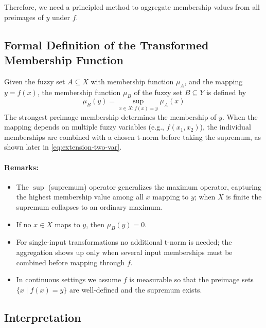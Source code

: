 Therefore, we need a principled method to aggregate membership values from all preimages of \( y \) under \( f \).

\subsection{Formal Definition of the Transformed Membership Function}
\label{sec:fuzzyrelations_formal_definition_of_the_transformed_membership_function}

Given the fuzzy set \( A \subseteq X \) with membership function \(\mu_A\), and the mapping \( y = f(x) \), the membership function \(\mu_B\) of the fuzzy set \( B \subseteq Y \) is defined by
\begin{equation}
    \mu_B(y) = \sup_{x \in X: f(x) = y} \mu_A(x)
    \label{eq:membership-transform}
\end{equation}
The strongest preimage membership determines the membership of \(y\). When the mapping depends on multiple fuzzy variables (e.g., \(f(x_1, x_2)\)), the individual memberships are combined with a chosen t\hyp{}norm before taking the supremum, as shown later in \eqref{eq:extension-two-var}.

\paragraph{Remarks:}
\begin{itemize}
    \item The \(\sup\) (supremum) operator generalizes the maximum operator, capturing the highest membership value among all \( x \) mapping to \( y \); when \(X\) is finite the supremum collapses to an ordinary maximum.
    \item If no \( x \in X \) maps to \( y \), then \(\mu_B(y) = 0\).
    \item For single-input transformations no additional t\hyp{}norm is needed; the aggregation shows up only when several input memberships must be combined before mapping through \(f\).
    \item In continuous settings we assume \(f\) is measurable so that the preimage sets \(\{x \mid f(x)=y\}\) are well-defined and the supremum exists.
\end{itemize}

\subsection{Interpretation}
\label{sec:fuzzyrelations_interpretation}

